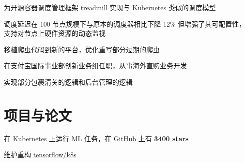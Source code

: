 \documentclass[]{deedy-resume-openfont}
\begin{document}
\begin{minipage}[t]{0.68\textwidth}
\begin{tightemize}
\item 为开源容器调度管理框架 treadmill 实现与 Kubernetes 类似的调度模型
\item 调度延迟在 100 节点规模下与原本的调度器相比下降 12\% 但增强了其可配置性，支持对节点上硬件资源的动态监视
\end{tightemize}
\sectionsep

\begin{tightemize}
\item 移植爬虫代码到新的平台，优化重写部分过期的爬虫
\end{tightemize}
\sectionsep

\begin{tightemize}
\item 在支付宝国际事业部创新业务组任职，从事海外直购业务开发
\item 实现部分包裹清关的逻辑和后台管理的逻辑
\end{tightemize}
\sectionsep


\section{项目与论文}
\sectionsep

\begin{tightemize}
    \item 在 Kubernetes 上运行 ML 任务，在 GitHub 上有 \textbf{3400 stars}
    \item 维护重构 \href{https://github.com/tensorflow/k8s}{tensorflow/k8s}
    \end{tightemize}
\sectionsep


% 
% 

\end{minipage}
\end{document}
